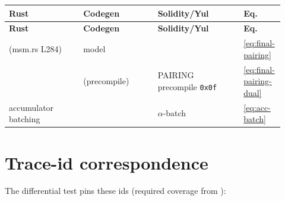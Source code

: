 \begin{longtable}{@{}L{0.26\linewidth}L{0.26\linewidth}L{0.30\linewidth}L{0.10\linewidth}@{}}
\toprule
\textbf{Rust} & \textbf{Codegen} & \textbf{Solidity/Yul} & \textbf{Eq.} \\
\midrule
\endfirsthead
\toprule
\textbf{Rust} & \textbf{Codegen} & \textbf{Solidity/Yul} & \textbf{Eq.} \\
\midrule
\endhead
{} (msm.rs L284) &
   model &
   &
  \eqref{eq:final-pairing} \\
 &
  (precompile) &
  PAIRING precompile \texttt{0x0f} &
  \eqref{eq:final-pairing-dual} \\
accumulator batching &
   &
   $\alpha$-batch &
  \eqref{eq:acc-batch} \\
\bottomrule
\end{longtable}

\section{Trace-id correspondence}
\label{sec:corr-trace}

The differential test pins these ids (required coverage from
):

